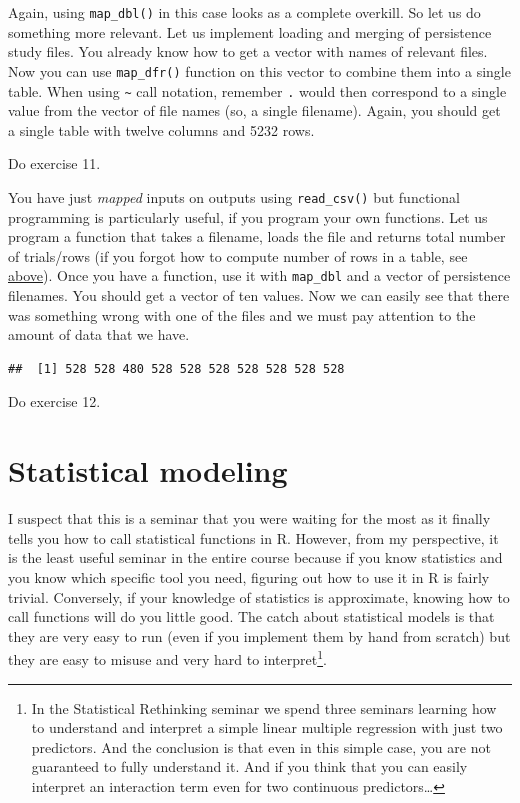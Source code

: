 \documentclass[
]{book}
\begin{document}
Again, using \texttt{map\_dbl()} in this case looks as a complete overkill. So let us do something more relevant. Let us implement loading and merging of persistence study files. You already know how to get a vector with names of relevant files. Now you can use \texttt{map\_dfr()} function on this vector to combine them into a single table. When using \texttt{\textasciitilde{}} call notation, remember \texttt{.} would then correspond to a single value from the vector of file names (so, a single filename). Again, you should get a single table with twelve columns and 5232 rows.

Do exercise 11.

You have just \emph{mapped} inputs on outputs using \texttt{read\_csv()} but functional programming is particularly useful, if you program your own functions. Let us program a function that takes a filename, loads the file and returns total number of trials/rows (if you forgot how to compute number of rows in a table, see \protect\hyperlink{forloop}{above}). Once you have a function, use it with \texttt{map\_dbl} and a vector of persistence filenames. You should get a vector of ten values. Now we can easily see that there was something wrong with one of the files and we must pay attention to the amount of data that we have.

\begin{verbatim}
##  [1] 528 528 480 528 528 528 528 528 528 528
\end{verbatim}

Do exercise 12.

\hypertarget{seminar11}{%
\chapter{Statistical modeling}\label{seminar11}}

I suspect that this is a seminar that you were waiting for the most as it finally tells you how to call statistical functions in R. However, from my perspective, it is the least useful seminar in the entire course because if you know statistics and you know which specific tool you need, figuring out how to use it in R is fairly trivial. Conversely, if your knowledge of statistics is approximate, knowing how to call functions will do you little good. The catch about statistical models is that they are very easy to run (even if you implement them by hand from scratch) but they are easy to misuse and very hard to interpret\footnote{In the Statistical Rethinking seminar we spend three seminars learning how to understand and interpret a simple linear multiple regression with just two predictors. And the conclusion is that even in this simple case, you are not guaranteed to fully understand it. And if you think that you can easily interpret an interaction term even for two continuous predictors\ldots{}}.
\end{document}
